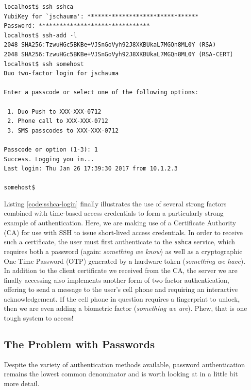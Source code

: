 \begin{lstlisting}[float,basicstyle=\scriptsize,label=code:sshca-login,caption={[SSHCA
and MFA example]An example of very strong
authentication: the use of a certificate authority,
combined with a password and multiple physical
tokens.}]
localhost$ ssh sshca
YubiKey for `jschauma': ********************************
Password: ********************************
localhost$ ssh-add -l
2048 SHA256:TzwuHGc5BKBe+VJSnGoVyh92J8XKBUkaL7MGQn8ML0Y (RSA)
2048 SHA256:TzwuHGc5BKBe+VJSnGoVyh92J8XKBUkaL7MGQn8ML0Y (RSA-CERT)
localhost$ ssh somehost
Duo two-factor login for jschauma

Enter a passcode or select one of the following options:

 1. Duo Push to XXX-XXX-0712
 2. Phone call to XXX-XXX-0712
 3. SMS passcodes to XXX-XXX-0712

Passcode or option (1-3): 1
Success. Logging you in...
Last login: Thu Jan 26 17:39:30 2017 from 10.1.2.3

somehost$
\end{lstlisting}

Listing \ref{code:sshca-login} finally illustrates the
use of several strong factors combined with time-based
access credentials to form a particularly strong
example of authentication.  Here, we are making use of
a Certificate Authority (CA) for use with SSH to issue short-lived
access credentials.  In order to receive such a
certificate, the user must first authenticate to the
{\tt sshca} service, which requires both a password
(again: {\em something we know}) as well as a
cryptographic One-Time Password
(OTP) generated by a
hardware token ({\em something we have}).  In addition
to the client certificate we received from the CA, the
server we are finally accessing also implements
another form of two-factor authentication, offering to
send a message to the user's cell phone and requiring
an interactive acknowledgement.  If the cell phone in
question requires a fingerprint to unlock, then we are
even adding a biometric factor ({\em something we
are}).  Phew, that is one tough system to access!

\subsection{The Problem with Passwords}
\label{multi-user:authentication:passwords}

Despite the variety of authentication methods
available, password authentication remains the lowest
common denominator and is worth looking at in a little
bit more detail.

